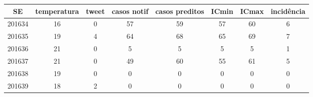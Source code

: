 \begin{tabular}{c|ccccccc}
  \hline
SE & temperatura & tweet & casos notif & casos preditos & ICmin & ICmax & incidência \\ 
  \hline
201634 & 16 & 0 & 57 & 59 & 57 & 60 & 6 \\ 
  201635 & 19 & 4 & 64 & 68 & 65 & 69 & 7 \\ 
  201636 & 21 & 0 & 5 & 5 & 5 & 5 & 1 \\ 
  201637 & 21 & 0 & 49 & 60 & 55 & 61 & 5 \\ 
  201638 & 19 & 0 & 0 & 0 & 0 & 0 & 0 \\ 
  201639 & 18 & 2 & 0 & 0 & 0 & 0 & 0 \\ 
   \hline
\end{tabular}
